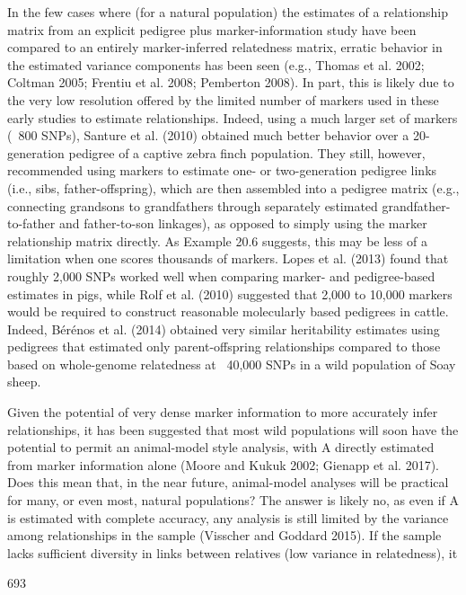 \documentclass{article}
\begin{document}
In the few cases where (for a natural population) the estimates of a relationship matrix from an explicit pedigree plus marker-information study have been compared to an entirely marker-inferred relatedness matrix, erratic behavior in the estimated variance components has been seen (e.g., Thomas et al. 2002; Coltman 2005; Frentiu et al. 2008; Pemberton 2008). In part, this is likely due to the very low resolution offered by the limited number of markers used in these early studies to estimate relationships. Indeed, using a much larger set of markers (~800 SNPs), Santure et al. (2010) obtained much better behavior over a 20-generation pedigree of a captive zebra finch population. They still, however, recommended using markers to estimate one- or two-generation pedigree links (i.e., sibs, father-offspring), which are then assembled into a pedigree matrix (e.g., connecting grandsons to grandfathers through separately estimated grandfather-to-father and father-to-son linkages), as opposed to simply using the marker relationship matrix directly. As Example 20.6 suggests, this may be less of a limitation when one scores thousands of markers. Lopes et al. (2013) found that roughly 2,000 SNPs worked well when comparing marker- and pedigree-based estimates in pigs, while Rolf et al. (2010) suggested that 2,000 to 10,000 markers would be required to construct reasonable molecularly based pedigrees in cattle. Indeed, Bérénos et al. (2014) obtained very similar heritability estimates using pedigrees that estimated only parent-offspring relationships compared to those based on whole-genome relatedness at ~40,000 SNPs in a wild population of Soay sheep.

Given the potential of very dense marker information to more accurately infer relationships, it has been suggested that most wild populations will soon have the potential to permit an animal-model style analysis, with A directly estimated from marker information alone (Moore and Kukuk 2002; Gienapp et al. 2017). Does this mean that, in the near future, animal-model analyses will be practical for many, or even most, natural populations? The answer is likely no, as even if A is estimated with complete accuracy, any analysis is still limited by the variance among relationships in the sample (Visscher and Goddard 2015). If the sample lacks sufficient diversity in links between relatives (low variance in relatedness), it

693
\end{document}
